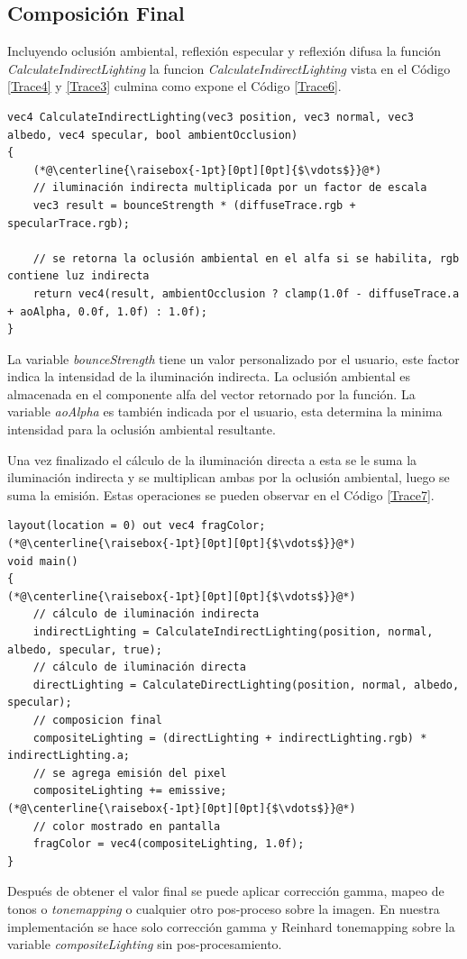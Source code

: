 \subsection{Composición Final} %
\label{sub:composicion_final}
Incluyendo oclusión ambiental, reflexión especular y reflexión difusa la función \emph{CalculateIndirectLighting} la funcion \emph{CalculateIndirectLighting} vista en el Código \ref{Trace4} y \ref{Trace3} culmina como expone el Código \ref{Trace6}.
\\
\begin{lstlisting}[caption={Composición para la iluminación indirecta.}, label=Trace6]
vec4 CalculateIndirectLighting(vec3 position, vec3 normal, vec3 albedo, vec4 specular, bool ambientOcclusion)
{
    (*@\centerline{\raisebox{-1pt}[0pt][0pt]{$\vdots$}}@*)
    // iluminación indirecta multiplicada por un factor de escala
    vec3 result = bounceStrength * (diffuseTrace.rgb + specularTrace.rgb);

    // se retorna la oclusión ambiental en el alfa si se habilita, rgb contiene luz indirecta
    return vec4(result, ambientOcclusion ? clamp(1.0f - diffuseTrace.a + aoAlpha, 0.0f, 1.0f) : 1.0f);
}
\end{lstlisting}

La variable \emph{bounceStrength} tiene un valor personalizado por el usuario, este factor indica la intensidad de la iluminación indirecta. La oclusión ambiental es almacenada en el componente alfa del vector retornado por la función. La variable \emph{aoAlpha} es también indicada por el usuario, esta determina la minima intensidad para la oclusión ambiental resultante.

Una vez finalizado el cálculo de la iluminación directa a esta se le suma la iluminación indirecta y se multiplican ambas por la oclusión ambiental, luego se suma la emisión. Estas operaciones se pueden observar en el Código \ref{Trace7}.
\\
\begin{lstlisting}[caption={Composición final de imagen.}, label=Trace7]
layout(location = 0) out vec4 fragColor;
(*@\centerline{\raisebox{-1pt}[0pt][0pt]{$\vdots$}}@*)
void main()
{
(*@\centerline{\raisebox{-1pt}[0pt][0pt]{$\vdots$}}@*)
    // cálculo de iluminación indirecta
    indirectLighting = CalculateIndirectLighting(position, normal, albedo, specular, true);
    // cálculo de iluminación directa
    directLighting = CalculateDirectLighting(position, normal, albedo, specular);
    // composicion final 
    compositeLighting = (directLighting + indirectLighting.rgb) * indirectLighting.a;
    // se agrega emisión del pixel
    compositeLighting += emissive;
(*@\centerline{\raisebox{-1pt}[0pt][0pt]{$\vdots$}}@*)
    // color mostrado en pantalla
    fragColor = vec4(compositeLighting, 1.0f);
}
\end{lstlisting}

Después de obtener el valor final se puede aplicar corrección gamma, mapeo de tonos o \emph{tonemapping} o cualquier otro pos-proceso sobre la imagen. En nuestra implementación se hace solo corrección gamma y Reinhard tonemapping \cite{Reinhard:2002:PTR:566570.566575} sobre la variable \emph{compositeLighting} sin pos-procesamiento.
